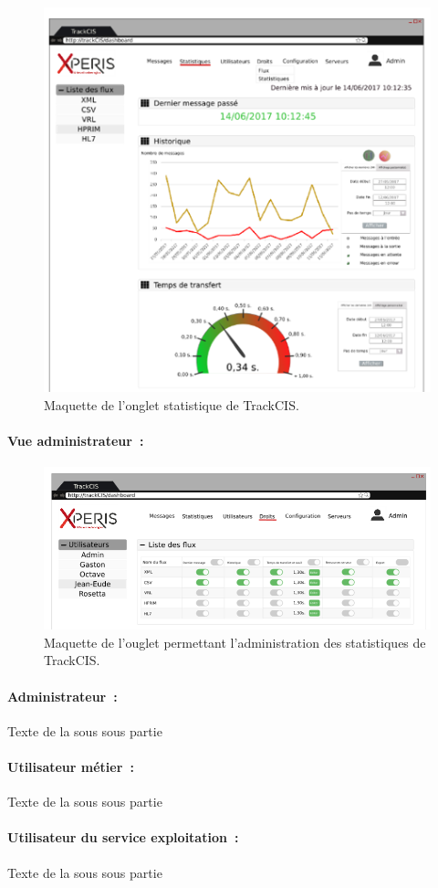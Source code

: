 			\begin{figure}[H]
				\centering
				\includegraphics[width=16cm]{../img/part2/maquette_user_1.png}
				\caption{\label{maquette_user} Maquette de l'onglet statistique de
				TrackCIS.}
			\end{figure}
			
			\paragraph{Vue administrateur~:}
			
			\begin{figure}[H]
				\centering
				\includegraphics[width=16cm]{../img/part2/maquette_admin_1.png}
				\caption{\label{maquette_admin} Maquette de l'ouglet permettant
				l'administration des statistiques de TrackCIS.}
			\end{figure}
		
			\paragraph{Administrateur~:}
			Texte de la sous sous partie
			
			\paragraph{Utilisateur métier~:}
			Texte de la sous sous partie
			
			\paragraph*{Utilisateur du service exploitation~:}
			Texte de la sous sous partie
			